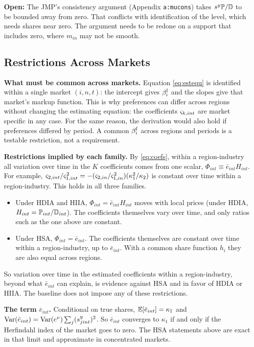 \textbf{Open:} The JMP's consistency argument (Appendix \texttt{a:mucons}) takes $s^y \P/\mathbb{D}$ to be bounded away from zero.
That conflicts with identification of the level, which needs shares near zero.
The argument needs to be redone on a support that includes zero, where $m_{in}$ may not be smooth.

\subsection{Restrictions Across Markets}\label{sec:app-common}

\textbf{What must be common across markets.}
Equation \eqref{eq:estequ} is identified within a single market $(i,n,t)$: the intercept gives $\b^l_i$ and the slopes give that market's markup function.
This is why preferences can differ across regions without changing the estimating equation: the coefficients $\vs_{k,int}$ are market specific in any case.
For the same reason, the derivation would also hold if preferences differed by period.
A common $\b^l_i$ across regions and periods is a testable restriction, not a requirement.

\textbf{Restrictions implied by each family.}
By \eqref{eq:coefs}, within a region-industry all variation over time in the $K$ coefficients comes from one scalar, $\Phi_{int} \equiv \bar{e}_{int} H_{int}$.
For example, $\vs_{2,int}/\vs_{1,int}^2 = -(\vs_{2,in}/\vs_{1,in}^2)(\kappa_1^2/\kappa_2)$ is constant over time within a region-industry.
This holds in all three families.
\begin{itemize}
	\item Under HDIA and HIIA, $\Phi_{int} = \bar{e}_{int} H_{int}$ moves with local prices (under HDIA, $H_{int} = \P_{int}/\mathbb{D}_{int}$). The coefficients themselves vary over time, and only ratios such as the one above are constant.
	\item Under HSA, $\Phi_{int} = \bar{e}_{int}$. The coefficients themselves are constant over time within a region-industry, up to $\bar{e}_{int}$. With a common share function $h_i$ they are also equal across regions.
\end{itemize}
So variation over time in the estimated coefficients within a region-industry, beyond what $\bar{e}_{int}$ can explain, is evidence against HSA and in favor of HDIA or HIIA.
The baseline does not impose any of these restrictions.

\textbf{The term $\bar{e}_{int}$.}
Conditional on true shares, $\E[\bar{e}_{int}] = \kappa_1$ and $\mathrm{Var}(\bar{e}_{int}) = \mathrm{Var}(e^{\n}) \sum_{j} (s^y_{jint})^2$.
So $\bar{e}_{int}$ converges to $\kappa_1$ if and only if the Herfindahl index of the market goes to zero.
The HSA statements above are exact in that limit and approximate in concentrated markets.

